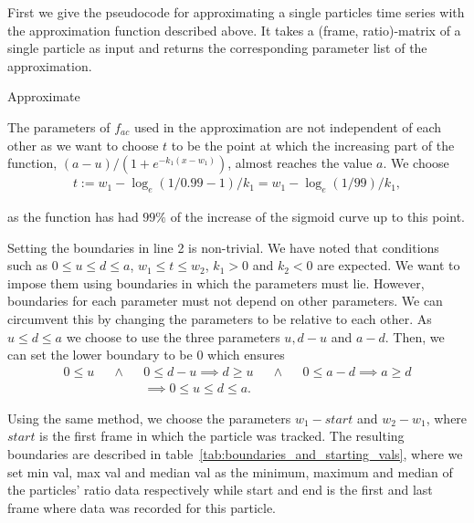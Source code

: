 First we give the pseudocode for approximating a single particles time series with the approximation function described above. It takes a (frame, ratio)-matrix of a single particle as input and returns the corresponding parameter list of the approximation.

\begin{algorithm}[H] \label{alg:approximate}
	\SetAlgoLined
	\DontPrintSemicolon
	\LinesNumbered
	\caption{Approximate}
	
	
	\BlankLine
\end{algorithm}

The parameters of $f_{ac}$ used in the approximation are not independent of each other as we want to choose $t$ to be the point at which the increasing part of the function, ${(a-u)/(1+e^{-k_1(x-w_1)})}$, almost reaches the value $a$. We choose
\begin{align*}
	t := w_1 - \log_e(1/0.99-1) / k_1 = w_1 - \log_e(1/99) / k_1,
\end{align*}

as the function has had $99\%$ of the increase of the sigmoid curve up to this point.

Setting the boundaries in line 2 is non-trivial. We have noted that conditions such as $0 \leq u \leq d \leq a$, $w_1 \leq t \leq w_2$, $k_1 > 0$ and $k_2 < 0$ are expected. We want to impose them using boundaries in which the parameters must lie. However, boundaries for each parameter must not depend on other parameters. We can circumvent this by changing the parameters to be relative to each other. As $u \leq d \leq a$ we choose to use the three parameters $u, d-u$ and $a-d$. Then, we can set the lower boundary to be $0$ which ensures
\begin{align*}
	0 \leq u &&\land &&0 \leq d - u \implies d \geq u &&\land &&0 \leq a - d \implies a \geq d\\
	&& &&\implies 0 \leq u \leq d \leq a.
\end{align*}

Using the same method, we choose the parameters $w_1 - start$ and $w_2 - w_1$, where $start$ is the first frame in which the particle was tracked. The resulting boundaries are described in table~\ref{tab:boundaries_and_starting_vals}, where we set min val, max val and median val as the minimum, maximum and median of the particles' ratio data respectively while start and end is the first and last frame where data was recorded for this particle.


